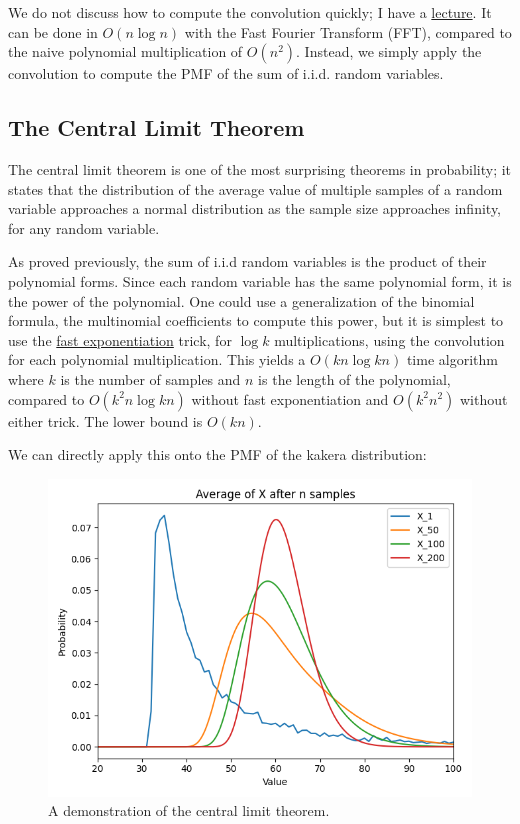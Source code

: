 \documentclass[11pt, oneside]{article}
\theoremstyle{plain}
\theoremstyle{definition}
\begin{document}
We do not discuss how to compute the convolution quickly; I have a 
\href{https://activities.tjhsst.edu/sct/lectures/2021/2020_10_23_FFT_handout.pdf}{lecture}.
It can be done in \( O(n \log n) \) with the Fast Fourier Transform
(FFT), compared to the naive polynomial multiplication of \( O(n^2)
\). Instead, we simply apply the convolution to compute the PMF of
the sum of i.i.d. random variables.

\subsection{The Central Limit Theorem}

The central limit theorem is one of the most surprising theorems in
probability; it states that the distribution of the average value of
multiple samples of a random variable approaches a normal distribution
as the sample size approaches infinity, for any random variable.

As proved previously, the sum of i.i.d random variables is the product of
their polynomial forms. Since each random variable has the same polynomial
form, it is the power of the polynomial. One could use a generalization of
the binomial formula, the multinomial coefficients to compute this power,
but it is simplest to use the \hyperref[alg:exp]{fast exponentiation} trick,
for \( \log k \) multiplications, using the convolution for each polynomial
multiplication. This yields a \( O(kn \log kn) \) time algorithm where \(
k \) is the number of samples and \( n \) is the length of the polynomial,
compared to \( O(k^2 n \log kn) \) without fast exponentiation and \( O(k^2
n^2) \) without either trick. The lower bound is \( O(kn) \).

We can directly apply this onto the PMF of the kakera distribution:
\begin{figure}[h!]
  \centering
  \includegraphics[scale=0.8]{images/graphs/clt.png}
  \caption{A demonstration of the central limit theorem.}
\end{figure}
\end{document}
